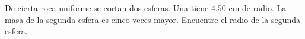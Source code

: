 \item De cierta roca uniforme se cortan dos esferas. Una tiene $4.50 \text{ cm}$ de radio. La masa de la segunda esfera es cinco veces mayor. Encuentre el radio de la segunda esfera.
